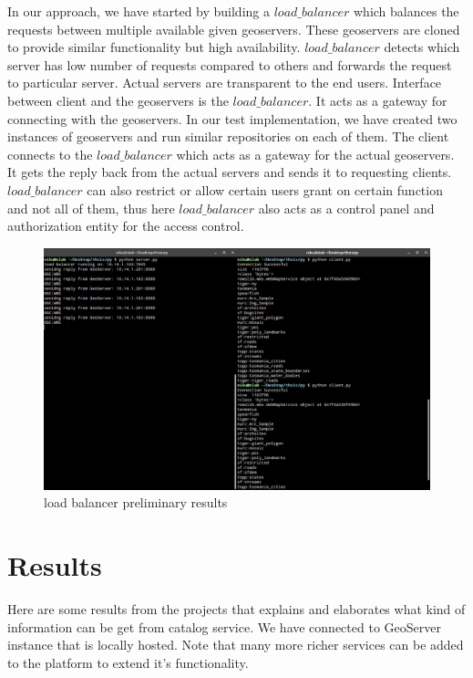 \par In our approach, we have started by building a $load\_balancer$ which balances the requests between multiple available given geoservers. These geoservers are cloned to provide similar functionality but high availability. $load\_balancer$ detects which server has low number of requests compared to others and forwards the request to particular server. Actual servers are transparent to the end users. Interface between client and the geoservers is the $load\_balancer$. It acts as a gateway for connecting with the geoservers. In our test implementation, we have created two instances of geoservers and run similar repositories on each of them. The client connects to the $load\_balancer$ which acts as a gateway for the actual geoservers. It gets the reply back from the actual servers and sends it to requesting clients. $load\_balancer$ can also restrict or allow certain users grant on certain function and not all of them, thus here $load\_balancer$ also acts as a control panel and authorization entity for the access control.
\newline
\begin{figure}[h]
    \centering
    \includegraphics[width=\textwidth]{pix/p13}
    \caption{load balancer preliminary results}
    \label{p13}
\end{figure}
\section{Results}
Here are some results from the projects that explains and elaborates what kind of information can be get from catalog service. We have connected to GeoServer instance that is locally hosted. Note that many more richer services can be added to the platform to extend it's functionality.

